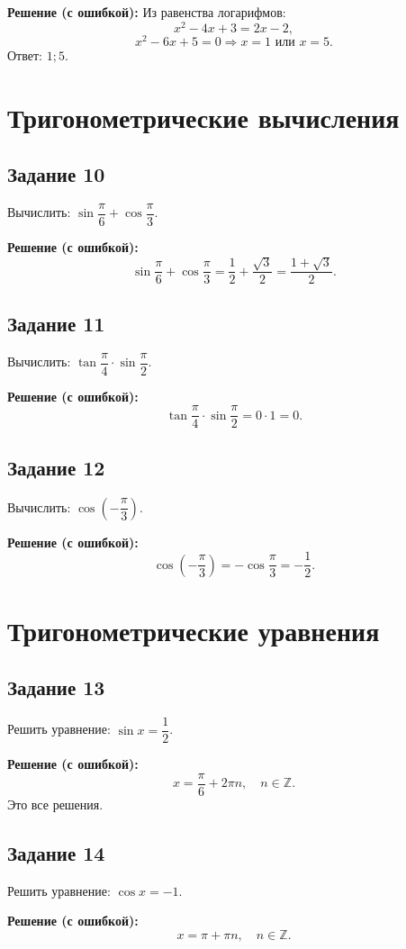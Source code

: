 \documentclass[12pt,a4paper]{article}
\begin{document}
\textbf{Решение (с ошибкой):}
Из равенства логарифмов:
\[
x^2-4x+3=2x-2,
\]
\[
x^2-6x+5=0 \Rightarrow x=1 \text{ или } x=5.
\]
Ответ: $1;5$.

\section{Тригонометрические вычисления}

\subsection*{Задание 10}
Вычислить: $\sin\dfrac{\pi}{6}+\cos\dfrac{\pi}{3}$.

\textbf{Решение (с ошибкой):}
\[
\sin\frac{\pi}{6}+\cos\frac{\pi}{3}
= \frac{1}{2}+\frac{\sqrt3}{2}
= \frac{1+\sqrt3}{2}.
\]

\subsection*{Задание 11}
Вычислить: $\tan\dfrac{\pi}{4}\cdot\sin\dfrac{\pi}{2}$.

\textbf{Решение (с ошибкой):}
\[
\tan\frac{\pi}{4}\cdot\sin\frac{\pi}{2}=0\cdot1=0.
\]

\subsection*{Задание 12}
Вычислить: $\cos\left(-\dfrac{\pi}{3}\right)$.

\textbf{Решение (с ошибкой):}
\[
\cos\left(-\frac{\pi}{3}\right)=-\cos\frac{\pi}{3}=-\frac{1}{2}.
\]

\section{Тригонометрические уравнения}

\subsection*{Задание 13}
Решить уравнение: $\sin x=\dfrac{1}{2}$.

\textbf{Решение (с ошибкой):}
\[
x=\frac{\pi}{6}+2\pi n,\quad n\in\mathbb Z.
\]
Это все решения.

\subsection*{Задание 14}
Решить уравнение: $\cos x=-1$.

\textbf{Решение (с ошибкой):}
\[
x=\pi+\pi n,\quad n\in\mathbb Z.
\]
\end{document}
